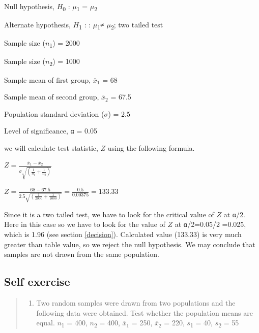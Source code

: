 \documentclass[
]{book}
\providecommand{\tightlist}{%
  \setlength{\itemsep}{0pt}\setlength{\parskip}{0pt}}
\begin{document}
Null hypothesis, \(H\)\textsubscript{0} : \(μ\)\textsubscript{1} = \(μ\)\textsubscript{2}

Alternate hypothesis, \(H\)\textsubscript{1} : : \(μ\)\textsubscript{1}≠ \(μ\)\textsubscript{2}; two tailed test

Sample size (\(n\)\textsubscript{1}) = 2000

Sample size (\(n\)\textsubscript{2}) = 1000

Sample mean of first group, \({\overline{x}}_{1}\) = 68

Sample mean of second group, \({\overline{x}}_{2}\) = 67.5

Population standard deviation (\(σ\)) = 2.5

Level of significance, α = 0.05

we will calculate test statistic, \(Z\) using the following formula.

\(Z = \frac{{\overline{x}}_{1} - {\overline{x}}_{2}}{\sigma\sqrt{\left( \frac{1}{n_{1}} + \frac{1}{n_{2}} \right)}}\)

\(Z = \frac{68 - 67.5}{2.5\sqrt{\left( \frac{1}{2000} + \frac{1}{1000} \right)}} = \frac{0.5}{0.00375} = 133.33\)

Since it is a two tailed test, we have to look for the critical value of \(Z\) at α/2. Here in this case so we have to look for the value of \(Z\) at α/2=0.05/2 =0.025, which is 1.96 (see section \ref{decision}). Calculated value (133.33) is very much greater than table value, so we reject the null hypothesis. We may conclude that samples are not drawn from the same population.

\hypertarget{self-exercise-1}{%
\subsection*{Self exercise}\label{self-exercise-1}}

\begin{quote}
\begin{enumerate}
\def\labelenumi{\arabic{enumi}.}
\setcounter{enumi}{2}
\tightlist
\item
  Two random samples were drawn from two populations and the following data were obtained. Test whether the population means are equal. \(n\)\textsubscript{1} = 400, \(n\)\textsubscript{2} = 400, \(\overline{x}_{1}\) = 250, \(\overline{x}_{2}\) = 220, \(s\)\textsubscript{1} = 40, \(s\)\textsubscript{2} = 55
\end{enumerate}
\end{quote}
\end{document}
